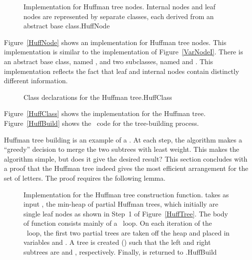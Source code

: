 \begin{figure}

\medskip
{}

\medskip
{}

\vspace{-\medskipamount}
{Implementation for Huffman tree nodes.
Internal nodes and leaf nodes are represented by separate classes,
each derived from an abstract base class.}{HuffNode}
\end{figure}

Figure~\ref{HuffNode} shows an implementation for Huffman tree nodes.
This implementation is similar to the  implementation
of Figure~\ref{VarNodeI}.
There is an abstract base class, named , and two
subclasses, named  and .
This implementation reflects the fact that leaf and internal nodes
contain distinctly different information.

\begin{figure}

\vspace{-\bigskipamount}
{Class declarations for the Huffman tree.}{HuffClass}
\end{figure}

Figure~\ref{HuffClass} shows the implementation
for the Huffman tree.
Figure~\ref{HuffBuild} shows the \Lang\ code for the tree-building
process. 

Huffman tree building is an example of a
.
At each step, the algorithm makes a ``greedy'' decision to merge
the two subtrees with least weight.
This makes the algorithm simple, but does it give the desired result?
This section concludes with a proof that the Huffman tree
indeed gives the most efficient arrangement for the set of letters.
The proof requires the following lemma.

\begin{figure}

\bigskip
{}
{Implementation for the Huffman tree construction function.
 takes as input , the min-heap
of partial Huffman trees, which initially are single leaf nodes as
shown in Step~1 of Figure~\ref{HuffTree}.
The body of function  consists mainly of a
\Cfor\ loop.
On each iteration of the \Cfor\ loop, the first two partial trees are
taken off the heap and placed in variables  and
.
A tree is created () such that the left and right subtrees 
are  and , respectively.
Finally,  is returned to .}{HuffBuild}
\bigskip
\end{figure}

